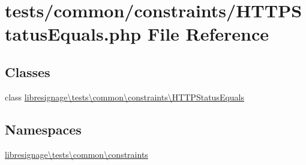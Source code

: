 \hypertarget{HTTPStatusEquals_8php}{}\section{tests/common/constraints/\+H\+T\+T\+P\+Status\+Equals.php File Reference}
\label{HTTPStatusEquals_8php}
\subsection*{Classes}
\begin{DoxyCompactItemize}
\item 
class \hyperlink{classlibresignage_1_1tests_1_1common_1_1constraints_1_1HTTPStatusEquals}{libresignage\textbackslash{}tests\textbackslash{}common\textbackslash{}constraints\textbackslash{}\+H\+T\+T\+P\+Status\+Equals}
\end{DoxyCompactItemize}
\subsection*{Namespaces}
\begin{DoxyCompactItemize}
\item 
 \hyperlink{namespacelibresignage_1_1tests_1_1common_1_1constraints}{libresignage\textbackslash{}tests\textbackslash{}common\textbackslash{}constraints}
\end{DoxyCompactItemize}
